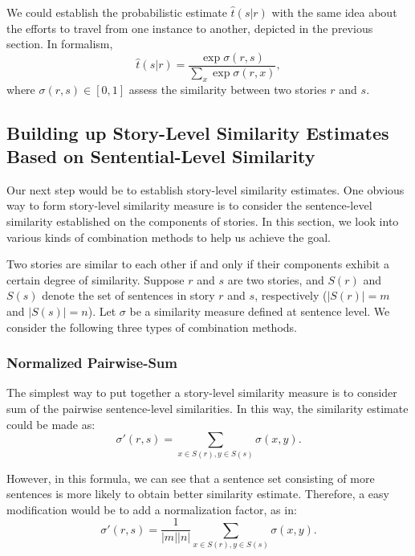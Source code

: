 \documentclass{article}[12pt]
\begin{document}

We could establish the probabilistic estimate $\hat{t}(s|r)$ with the same idea
about the efforts to travel from one instance to another, depicted in the
previous section.  In formalism, \[\hat{t}(s|r) = \frac{\exp
\sigma(r,s)}{\sum_x \exp \sigma(r,x)},\] where $\sigma(r,s) \in [0,1]$ assess
the similarity between two stories $r$ and $s$.

\subsection{Building up Story-Level Similarity Estimates Based on
Sentential-Level Similarity}\label{storylevel}

Our next step would be to establish story-level similarity estimates.  One
obvious way to form story-level similarity measure is to consider the
sentence-level similarity established on the components of stories.  In this
section, we look into various kinds of combination methods to help us achieve
the goal.  

Two stories are similar to each other if and only if their components exhibit a
certain degree of similarity.  Suppose $r$ and $s$ are two stories, and $S(r)$
and $S(s)$ denote the set of sentences in story $r$ and $s$, respectively
($|S(r)| = m$ and $|S(s)| = n$).  Let $\sigma$ be a similarity measure defined
at sentence level.  We consider the following three types of combination
methods.

\subsubsection{Normalized Pairwise-Sum}

The simplest way to put together a story-level similarity measure is to
consider sum of the pairwise sentence-level similarities.  In this way, the
similarity estimate could be made as: \[\sigma'(r,s) = \sum\limits_{x \in S(r),
y \in S(s)} \sigma(x,y).\]

However, in this formula, we can see that a sentence set consisting of more
sentences is more likely to obtain better similarity estimate.  Therefore, a
easy modification would be to add a normalization factor, as in: \[\sigma'(r,s)
= \frac{1}{|m||n|} \sum\limits_{x \in S(r), y \in S(s)} \sigma(x,y).\]
\end{document}

